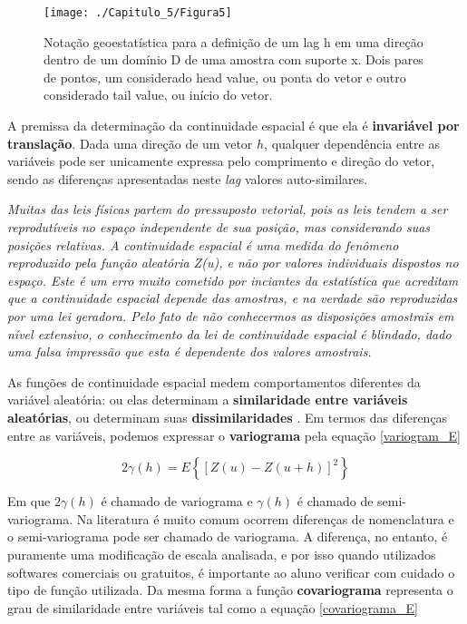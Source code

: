 \FloatBarrier
\begin{figure}[!htb]
	\centering
	\texttt{[image: ./Capitulo\_5/Figura5]}
	\caption{Notação geoestatística para a definição de um lag h em uma direção dentro de um domínio D de uma amostra com suporte x. Dois pares de pontos, um considerado head value, ou ponta do vetor e outro considerado tail value, ou início do vetor.}
	\label{Figura5}
\end{figure}
\FloatBarrier

A premissa da determinação da continuidade espacial é que ela é \textbf{invariável por translação}. Dada uma direção de um vetor $h$, qualquer dependência entre as variáveis pode ser unicamente expressa pelo comprimento e direção do vetor, sendo as diferenças apresentadas neste \textit{lag} valores auto-similares.

\begin{proposition}
	\textit{Muitas das leis físicas partem do pressuposto vetorial, pois as leis tendem a ser reprodutíveis no espaço independente de sua posição, mas considerando suas posições relativas. A continuidade espacial é uma medida do fenômeno reproduzido pela função aleatória Z(u), e não por valores individuais dispostos no espaço. Este é um erro muito cometido por inciantes da estatística que acreditam que a continuidade espacial depende das amostras, e na verdade são reproduzidas por uma lei geradora. Pelo fato de não conhecermos as disposições amostrais em nível extensivo, o conhecimento da lei de continuidade espacial é blindado, dado uma falsa impressão que esta é dependente dos valores amostrais.} 
\end{proposition}


As funções de continuidade espacial medem comportamentos diferentes da variável aleatória: ou elas determinam a \textbf{similaridade entre variáveis aleatórias}, ou determinam suas \textbf{dissimilaridades} . Em termos das diferenças entre as variáveis, podemos expressar o \textbf{variograma} pela equação \ref{variogram_E}

\begin{equation} \label{variogram_E} 
2 \gamma(h) = E \left\{ \left[ Z(u) - Z(u+h) \right]^{2} \right\}
\end{equation}

Em que $2\gamma(h)$ é chamado de variograma e $\gamma(h)$ é chamado de semi-variograma. Na literatura é muito comum ocorrem diferenças de nomenclatura e o semi-variograma pode ser chamado de variograma. A diferença, no entanto, é puramente uma modificação de escala analisada, e por isso quando utilizados softwares comerciais ou gratuitos, é importante ao aluno verificar com cuidado o tipo de função utilizada. Da mesma forma a função \textbf{covariograma} representa o grau de similaridade entre variáveis tal como a equação \ref{covariograma_E}


